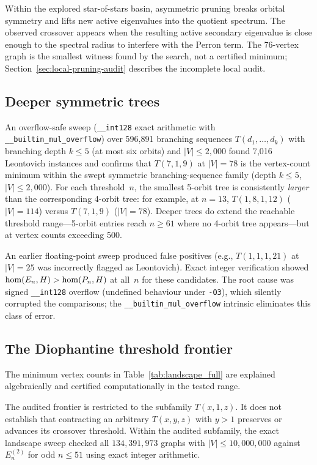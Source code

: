 Within the explored star-of-stars basin, asymmetric pruning breaks orbital
symmetry and lifts new active eigenvalues into the quotient spectrum. The
observed crossover appears when the resulting active secondary eigenvalue is
close enough to the spectral radius to interfere with the Perron term. The
76-vertex graph is the smallest witness found by the search, not a certified
minimum; Section~\ref{sec:local-pruning-audit} describes the incomplete local
audit.

\subsection*{Deeper symmetric trees}

An overflow-safe sweep (\texttt{\_\_int128} exact arithmetic with
\texttt{\_\_builtin\_mul\_overflow}) over 596,891 branching sequences
$T(d_1, \ldots, d_k)$ with branching depth $k \le 5$ (at most six
orbits) and $|V| \le 2{,}000$
found 7,016 Leontovich instances and confirms that $T(7,1,9)$ at
$|V| = 78$ is the vertex-count minimum within the swept symmetric
branching-sequence family (depth $k\le5$, $|V|\le2{,}000$). For each
threshold~$n$, the smallest 5-orbit tree is
consistently \emph{larger} than the corresponding 4-orbit tree:
for example, at $n = 13$, $T(1,8,1,12)$ ($|V| = 114$) versus
$T(7,1,9)$ ($|V| = 78$).  Deeper trees do extend the reachable
threshold range---5-orbit entries reach $n \ge 61$ where no 4-orbit
tree appears---but at vertex counts exceeding 500.

An earlier floating-point sweep produced false positives (e.g.,
$T(1,1,1,21)$ at $|V| = 25$ was incorrectly flagged as Leontovich).
Exact integer verification showed $\mathrm{hom}(E_n, H) > \mathrm{hom}(P_n, H)$ at
all~$n$ for these candidates.  The root cause was signed
\texttt{\_\_int128} overflow (undefined behaviour under \texttt{-O3}),
which silently corrupted the comparisons; the
\texttt{\_\_builtin\_mul\_overflow} intrinsic eliminates this class
of error.

\subsection*{The Diophantine threshold frontier}

The minimum vertex counts in Table~\ref{tab:landscape_full} are
explained algebraically and certified computationally in the tested range.

The audited frontier is restricted to the subfamily $T(x,1,z)$. It does
not establish that contracting an arbitrary $T(x,y,z)$ with $y>1$
preserves or advances its crossover threshold. Within the audited
subfamily, the exact landscape sweep checked all $134{,}391{,}973$
graphs with $|V| \le 10{,}000{,}000$ against $E_n^{(2)}$ for odd
$n \le 51$ using exact integer arithmetic.


